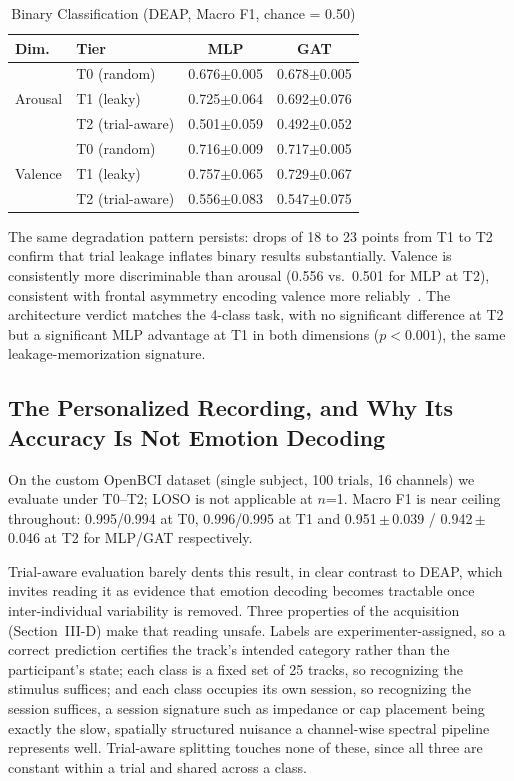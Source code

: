 \documentclass[conference,a4paper]{IEEEtran}
\begin{document}
\begin{table}[t]
\centering
\caption{Binary Classification (DEAP, Macro F1, chance = 0.50)}
\label{tab:binary}
\begin{tabular}{llcc}
\toprule
Dim. & Tier & MLP & GAT \\
\midrule
\multirow{3}{*}{Arousal}
 & T0 (random) & 0.676{\scriptsize$\pm$0.005} & 0.678{\scriptsize$\pm$0.005} \\
 & T1 (leaky) & 0.725{\scriptsize$\pm$0.064} & 0.692{\scriptsize$\pm$0.076} \\
 & T2 (trial-aware) & 0.501{\scriptsize$\pm$0.059} & 0.492{\scriptsize$\pm$0.052} \\
\midrule
\multirow{3}{*}{Valence}
 & T0 (random) & 0.716{\scriptsize$\pm$0.009} & 0.717{\scriptsize$\pm$0.005} \\
 & T1 (leaky) & 0.757{\scriptsize$\pm$0.065} & 0.729{\scriptsize$\pm$0.067} \\
 & T2 (trial-aware) & 0.556{\scriptsize$\pm$0.083} & 0.547{\scriptsize$\pm$0.075} \\
\bottomrule
\end{tabular}
\end{table}

The same degradation pattern persists: drops of 18 to 23 points from T1 to T2 confirm that trial leakage inflates binary results substantially. Valence is consistently more discriminable than arousal (0.556 vs.\ 0.501 for MLP at T2), consistent with frontal asymmetry encoding valence more reliably~\cite{allen2004, smith2017}. The architecture verdict matches the 4-class task, with no significant difference at T2 but a significant MLP advantage at T1 in both dimensions ($p<0.001$), the same leakage-memorization signature.

\subsection{The Personalized Recording, and Why Its Accuracy Is Not Emotion Decoding}
\label{sec:openbci}

On the custom OpenBCI dataset (single subject, 100 trials, 16 channels) we evaluate under T0--T2; LOSO is not applicable at $n$=1. Macro F1 is near ceiling throughout: 0.995/0.994 at T0, 0.996/0.995 at T1 and 0.951\,$\pm$\,0.039 / 0.942\,$\pm$\,0.046 at T2 for MLP/GAT respectively.

Trial-aware evaluation barely dents this result, in clear contrast to DEAP, which invites reading it as evidence that emotion decoding becomes tractable once inter-individual variability is removed. Three properties of the acquisition (Section~III-D) make that reading unsafe. Labels are experimenter-assigned, so a correct prediction certifies the track's intended category rather than the participant's state; each class is a fixed set of 25 tracks, so recognizing the stimulus suffices; and each class occupies its own session, so recognizing the session suffices, a session signature such as impedance or cap placement being exactly the slow, spatially structured nuisance a channel-wise spectral pipeline represents well. Trial-aware splitting touches none of these, since all three are constant within a trial and shared across a class.
\end{document}
